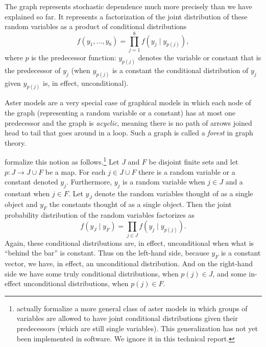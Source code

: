 \documentclass[11pt]{article}
\begin{document}
The graph represents stochastic dependence much more precisely than we have
explained so far.  It represents a factorization of the joint distribution
of these random variables as a product of conditional distributions
\begin{equation} \label{eq:factorize}
   f(y_1, \ldots, y_8) = \prod_{j = 1}^8 f(y_j \mid y_{p(j)}),
\end{equation}
where $p$ is the predecessor function: $y_{p(j)}$ denotes the variable
or constant that is the predecessor of $y_j$ (when $y_{p(j)}$ is a constant
the conditional distribution of $y_j$ given $y_{p(j)}$ is, in effect,
unconditional).


Aster models are a very special case
of graphical models in which each node of the graph (representing a random
variable or a constant) has at most one predecessor and the graph is
\emph{acyclic}, meaning there is no path of arrows joined head to tail that
goes around in a loop.  Such a graph is called
a \emph{forest} in graph theory.

\citet{gws} formalize this notion as follows.\footnote{\citet{gws} actually
formalize a more general class of aster models in which groups of variables
are allowed to have joint conditional distributions given their predecessors
(which are still single variables).  This generalization has not yet been
implemented in software.  We ignore it in this
technical report.\label{foot:group}}
Let $J$ and $F$ be disjoint
finite sets and let $p : J \to J \cup F$ be a map.  For each $j \in J \cup F$
there is a random variable or a constant denoted $y_j$.  Furthermore, $y_j$
is a random variable when $j \in J$ and a constant when $j \in F$.  Let $y_J$
denote the random variables thought of as a single object and $y_F$ the
constants thought of as a single object.  Then the joint probability
distribution of the random variables factorizes as
\begin{equation} \label{eq:factorize-too}
   f(y_J \mid y_F) = \prod_{j \in J} f(y_j \mid y_{p(j)}).
\end{equation}
Again, these conditional distributions are, in effect, unconditional when
what is ``behind the bar'' is constant.  Thus on the left-hand side, because
$y_F$ is a constant vector, we have, in effect, an unconditional distribution.
And on the right-hand side we have some truly conditional distributions,
when $p(j) \in J$, and some in-effect unconditional distributions,
when $p(j) \in F$.
\end{document}
